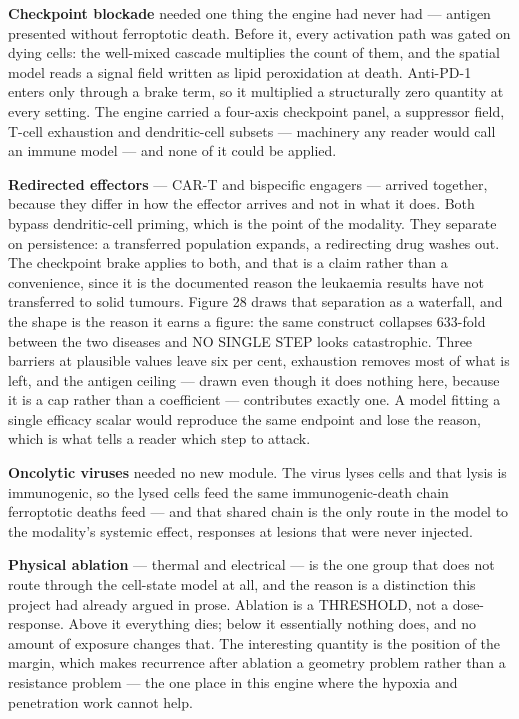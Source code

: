 \documentclass[11pt,twoside,openright]{report}
\begin{document}
\textbf{Checkpoint blockade} needed one thing the engine had never had --- antigen presented without ferroptotic death. Before it, every activation path was gated on dying cells: the well-mixed cascade multiplies the count of them, and the spatial model reads a signal field written as lipid peroxidation at death. Anti-PD-1 enters only through a brake term, so it multiplied a structurally zero quantity at every setting. The engine carried a four-axis checkpoint panel, a suppressor field, T-cell exhaustion and dendritic-cell subsets --- machinery any reader would call an immune model --- and none of it could be applied.

\textbf{Redirected effectors} --- CAR-T and bispecific engagers --- arrived together, because they differ in how the effector arrives and not in what it does. Both bypass dendritic-cell priming, which is the point of the modality. They separate on persistence: a transferred population expands, a redirecting drug washes out. The checkpoint brake applies to both, and that is a claim rather than a convenience, since it is the documented reason the leukaemia results have not transferred to solid tumours. Figure 28 draws that separation as a waterfall, and the shape is the reason it earns a figure: the same construct collapses 633-fold between the two diseases and NO SINGLE STEP looks catastrophic. Three barriers at plausible values leave six per cent, exhaustion removes most of what is left, and the antigen ceiling --- drawn even though it does nothing here, because it is a cap rather than a coefficient --- contributes exactly one. A model fitting a single efficacy scalar would reproduce the same endpoint and lose the reason, which is what tells a reader which step to attack.

\textbf{Oncolytic viruses} needed no new module. The virus lyses cells and that lysis is immunogenic, so the lysed cells feed the same immunogenic-death chain ferroptotic deaths feed --- and that shared chain is the only route in the model to the modality's systemic effect, responses at lesions that were never injected.

\textbf{Physical ablation} --- thermal and electrical --- is the one group that does not route through the cell-state model at all, and the reason is a distinction this project had already argued in prose. Ablation is a THRESHOLD, not a dose-response. Above it everything dies; below it essentially nothing does, and no amount of exposure changes that. The interesting quantity is the position of the margin, which makes recurrence after ablation a geometry problem rather than a resistance problem --- the one place in this engine where the hypoxia and penetration work cannot help.
\end{document}
